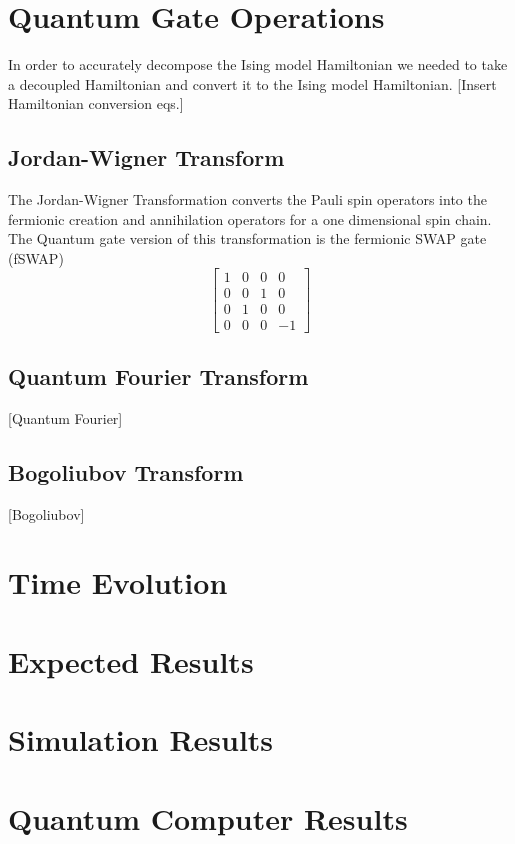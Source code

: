 \documentclass[acmtog]{acmart}
\begin{document}
\section{Quantum Gate Operations}
In order to accurately decompose the Ising model Hamiltonian we needed to take a decoupled Hamiltonian and convert it to the Ising model Hamiltonian. [Insert Hamiltonian conversion eqs.]

\subsection{Jordan-Wigner Transform}
The Jordan-Wigner Transformation converts the Pauli spin operators into the fermionic creation and annihilation operators for a one dimensional spin chain. The Quantum gate version of this transformation is the fermionic SWAP gate (fSWAP) \cite{Cervera18}
\begin{equation}
    \begin{bmatrix}
        1 & 0 & 0 & 0 \\
        0 & 0 & 1 & 0 \\
        0 & 1 & 0 & 0 \\
        0 & 0 & 0 & -1
    \end{bmatrix}
\end{equation}


\subsection{Quantum Fourier Transform}
[Quantum Fourier]

\subsection{Bogoliubov Transform}
[Bogoliubov]

\section{Time Evolution}


\section{Expected Results}


\section{Simulation Results}


\section{Quantum Computer Results}
\end{document}
